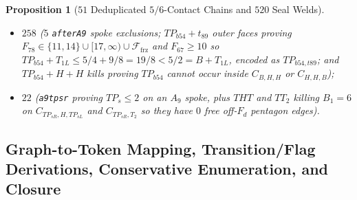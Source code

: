 \documentclass[11pt,reqno]{amsart}
\theoremstyle{plain}
\newtheorem{proposition}[theorem]{Proposition}
\theoremstyle{definition}
\theoremstyle{remark}
\newcommand{\Ffrz}{\mathcal{F}_{\mathrm{frz}}}
\DeclareRobustCommand{\_}{\ifmmode\text{\textunderscore}\else\textunderscore\allowbreak\fi}
\begin{document}
\begin{proposition}[$51$ Deduplicated $5/6$-Contact Chains and $520$ Seal Welds]
\begin{enumerate}[label=(\roman*),leftmargin=2.2em]
\begin{itemize}[leftmargin=1.5em]
    \item $258$ ($5$ \texttt{after\_A9} spoke exclusions; $TP_{b54} + t_{89}$ outer faces proving $F_{78} \in \{11, 14\} \cup [17,\infty) \cup \Ffrz$ and $F_{67} \ge 10$ so $TP_{b54} + T_{1L} \le 5/4 + 9/8 = 19/8 < 5/2 = B + T_{1L}$, encoded as $TP_{b54,t89}$; and $TP_{b54} + H + H$ kills proving $TP_{b54}$ cannot occur inside $C_{B,H,H}$ or $C_{H,H,B}$);
    \item $22$ (\texttt{a9\_tpsr} proving $TP_s \le 2$ on an $A_9$ spoke, plus $THT$ and $TT_2$ killing $B_1 = 6$ on $C_{TP_{sR}, H, TP_{sL}}$ and $C_{TP_{sR}, T_2}$ so they have $0$ free off-$F_d$ pentagon edges).
  \end{itemize}
\end{enumerate}
\end{proposition}

\subsection{Graph-to-Token Mapping, Transition/Flag Derivations, Conservative Enumeration, and Closure}\label{subsec:cubic-proof}
\end{document}
